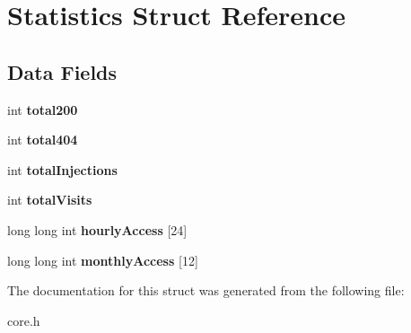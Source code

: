 \hypertarget{struct_statistics}{\section{Statistics Struct Reference}
\label{struct_statistics}
}
\subsection*{Data Fields}
\begin{DoxyCompactItemize}
\item 
\hypertarget{struct_statistics_a3d9f2a6c24570236f6edd05dff804d03}{int {\bfseries total200}}\label{struct_statistics_a3d9f2a6c24570236f6edd05dff804d03}

\item 
\hypertarget{struct_statistics_a62d495d9811a2a8a3c0d9d3b4cc201f0}{int {\bfseries total404}}\label{struct_statistics_a62d495d9811a2a8a3c0d9d3b4cc201f0}

\item 
\hypertarget{struct_statistics_aefcb67879169684ac40167225767bdbe}{int {\bfseries total\-Injections}}\label{struct_statistics_aefcb67879169684ac40167225767bdbe}

\item 
\hypertarget{struct_statistics_a730b68baeee01715620647f348bb789f}{int {\bfseries total\-Visits}}\label{struct_statistics_a730b68baeee01715620647f348bb789f}

\item 
\hypertarget{struct_statistics_a5d2c00ae7b41276b97cf4a2be29001c1}{long long int {\bfseries hourly\-Access} \mbox{[}24\mbox{]}}\label{struct_statistics_a5d2c00ae7b41276b97cf4a2be29001c1}

\item 
\hypertarget{struct_statistics_ad0d0d2ffdddb1d6259d24ee70abfd4c4}{long long int {\bfseries monthly\-Access} \mbox{[}12\mbox{]}}\label{struct_statistics_ad0d0d2ffdddb1d6259d24ee70abfd4c4}

\end{DoxyCompactItemize}


The documentation for this struct was generated from the following file\-:\begin{DoxyCompactItemize}
\item 
core.\-h\end{DoxyCompactItemize}
